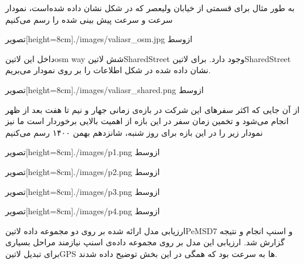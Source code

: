 به طور مثال برای قسمتی از خیابان ولیعصر که در شکل  نشان داده شده‌است، نمودار سرعت و سرعت پیش بینی شده را رسم می‌کنیم

  ‌تصویر[height=8cm]{./images/valiasr_osm.jpg}
  ‌ازوسط

داخل این ‌لاتین{osm way} شش ‌لاتین{SharedStreet} وجود دارد. برای ‌لاتین{SharedStreet} نشان داده شده در شکل  اطلاعات را بر روی نمودار می‌بریم.

  ‌تصویر[height=8cm]{./images/valiasr_shared.png}
  ‌ازوسط

از آن جایی که اکثر سفرهای این شرکت در بازه‌ی زمانی جهار و نیم تا هفت بعد از ظهر انجام می‌شود و تخمین زمان سفر در این بازه از اهمیت بالایی برخوردار است ما نیز نمودار زیر را در این بازه برای روز شنبه، شانزدهم بهمن ۱۴۰۰ رسم می‌کنیم


  ‌تصویر[height=8cm]{./images/p1.png}
  ‌ازوسط

  ‌تصویر[height=8cm]{./images/p2.png}
  ‌ازوسط

  ‌تصویر[height=8cm]{./images/p3.png}
  ‌ازوسط

  ‌تصویر[height=8cm]{./images/p4.png}
  ‌ازوسط


ارزیابی مدل ارائه شده بر روی دو مجموعه داده ‌لاتین{PeMSD7} و اسنپ انجام و نتیجه گزارش شد. ارزیابی این مدل بر روی مجموعه داده‌ی اسنپ نیازمند مراحل بسیاری برای تبدیل ‌لاتین{GPS} ها به سرعت بود که همگی در این بخش توضیح داده شدند.
